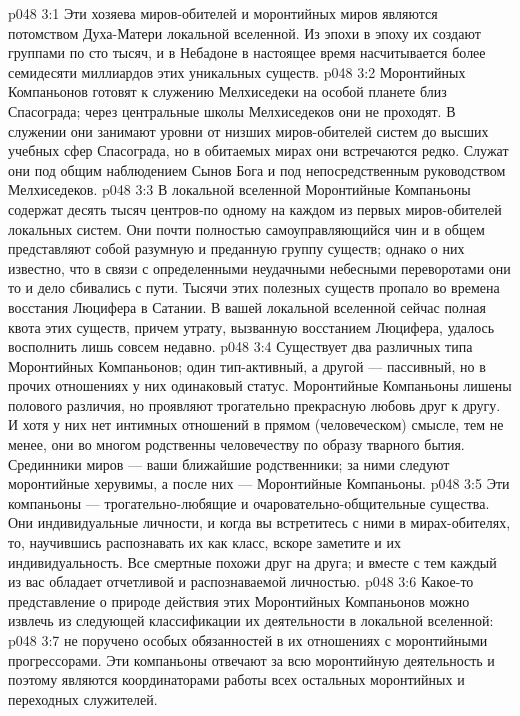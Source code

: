 \vs p048 3:1 Эти хозяева миров\hyp{}обителей и моронтийных миров являются потомством Духа\hyp{}Матери локальной вселенной. Из эпохи в эпоху их создают группами по сто тысяч, и в Небадоне в настоящее время насчитывается более семидесяти миллиардов этих уникальных существ.
\vs p048 3:2 Моронтийных Компаньонов готовят к служению Мелхиседеки на особой планете близ Спасограда; через центральные школы Мелхиседеков они не проходят. В служении они занимают уровни от низших миров\hyp{}обителей систем до высших учебных сфер Спасограда, но в обитаемых мирах они встречаются редко. Служат они под общим наблюдением Сынов Бога и под непосредственным руководством Мелхиседеков.
\vs p048 3:3 В локальной вселенной Моронтийные Компаньоны содержат десять тысяч центров\hyp{}по одному на каждом из первых миров\hyp{}обителей локальных систем. Они почти полностью самоуправляющийся чин и в общем представляют собой разумную и преданную группу существ; однако о них известно, что в связи с определенными неудачными небесными переворотами они то и дело сбивались с пути. Тысячи этих полезных существ пропало во времена восстания Люцифера в Сатании. В вашей локальной вселенной сейчас полная квота этих существ, причем утрату, вызванную восстанием Люцифера, удалось восполнить лишь совсем недавно.
\vs p048 3:4 \pc Существует два различных типа Моронтийных Компаньонов; один тип\hyp{}активный, а другой --- пассивный, но в прочих отношениях у них одинаковый статус. Моронтийные Компаньоны лишены полового различия, но проявляют трогательно прекрасную любовь друг к другу. И хотя у них нет интимных отношений в прямом (человеческом) смысле, тем не менее, они во многом родственны человечеству по образу тварного бытия. Срединники миров --- ваши ближайшие родственники; за ними следуют моронтийные херувимы, а после них --- Моронтийные Компаньоны.
\vs p048 3:5 Эти компаньоны --- трогательно\hyp{}любящие и очаровательно\hyp{}общительные существа. Они индивидуальные личности, и когда вы встретитесь с ними в мирах\hyp{}обителях, то, научившись распознавать их как класс, вскоре заметите и их индивидуальность. Все смертные похожи друг на друга; и вместе с тем каждый из вас обладает отчетливой и распознаваемой личностью.
\vs p048 3:6 \pc Какое\hyp{}то представление о природе действия этих Моронтийных Компаньонов можно извлечь из следующей классификации их деятельности в локальной вселенной:
\vs p048 3:7 \bibnobreakspace {} не поручено особых обязанностей в их отношениях с моронтийными прогрессорами. Эти компаньоны отвечают за всю моронтийную деятельность и поэтому являются координаторами работы всех остальных моронтийных и переходных служителей.
